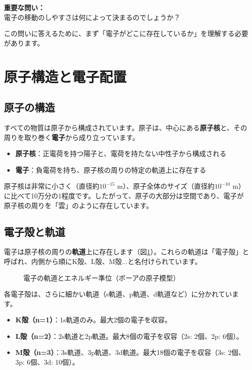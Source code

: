 \begin{screen}
\textbf{重要な問い：}\\
電子の移動のしやすさは何によって決まるのでしょうか？
\end{screen}

この問いに答えるために、まず「電子がどこに存在しているか」を理解する必要があります。


\section{原子構造と電子配置}

\subsection{原子の構造}

すべての物質は原子から構成されています。原子は、中心にある\textbf{原子核}と、その周りを取り巻く\textbf{電子}から成り立っています。

\begin{itemize}
\item \textbf{原子核}：正電荷を持つ陽子と、電荷を持たない中性子から構成される
\item \textbf{電子}：負電荷を持ち、原子核の周りの特定の軌道上に存在する
\end{itemize}

原子核は非常に小さく（直径約$10^{-15}$ m）、原子全体のサイズ（直径約$10^{-10}$ m）に比べて10万分の1程度です。したがって、原子の大部分は空間であり、電子が原子核の周りを「雲」のように存在しています。

\subsection{電子殻と軌道}

電子は原子核の周りの\textbf{軌道}上に存在します（図\ref{fig:electron_orbit}）。これらの軌道は「電子殻」と呼ばれ、内側から順にK殻、L殻、M殻...と名付けられています。

\begin{figure}[H]
\centering
{}
\caption{電子の軌道とエネルギー準位（ボーアの原子模型）}
\label{fig:electron_orbit}
\end{figure}

各電子殻は、さらに細かい軌道（s軌道、p軌道、d軌道など）に分かれています。

\begin{itemize}
\item \textbf{K殻（n=1）}：1s軌道のみ。最大2個の電子を収容。
\item \textbf{L殻（n=2）}：2s軌道と2p軌道。最大8個の電子を収容（2s: 2個、2p: 6個）。
\item \textbf{M殻（n=3）}：3s軌道、3p軌道、3d軌道。最大18個の電子を収容（3s: 2個、3p: 6個、3d: 10個）。
\end{itemize}

